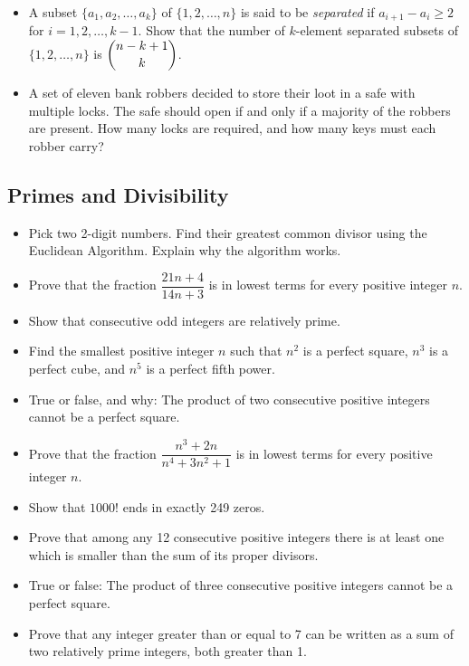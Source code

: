 \documentclass[12pt]{article}
\begin{document}
\begin{itemize}
  \item A subset $\{a_1, a_2, \ldots, a_k\}$ of $\{1, 2, \ldots, n\}$ is said to be \emph{separated} if $a_{i+1} - a_i \ge 2$ for $i = 1, 2, \ldots, k-1$. Show that the number of $k$-element separated subsets of $\{1, 2, \ldots, n\}$ is $\dbinom{n-k+1}{k}$.

  \item  A set of eleven bank robbers decided to store their loot in a safe with multiple locks. The safe should open if and only if a majority of the robbers are present. How many locks are required, and how many keys must each robber carry?
\end{itemize}

\subsection{Primes and Divisibility}
\begin{itemize}
  \item Pick two 2-digit numbers. Find their greatest common divisor using the Euclidean Algorithm. Explain why the algorithm works.

  \item Prove that the fraction $\dfrac{21n+4}{14n+3}$ is in lowest terms for every positive integer $n$.

  \item Show that consecutive odd integers are relatively prime.

  \item Find the smallest positive integer $n$ such that $n^2$ is a perfect square, $n^3$ is a perfect cube, and $n^5$ is a perfect fifth power.

  \item True or false, and why: The product of two consecutive positive integers cannot be a perfect square.

  \item Prove that the fraction $\dfrac{n^3+2n}{n^4+3n^2+1}$ is in lowest terms for every positive integer $n$.

  \item Show that $1000!$ ends in exactly 249 zeros.

  \item Prove that among any 12 consecutive positive integers there is at least one which is smaller than the sum of its proper divisors.

  \item True or false: The product of three consecutive positive integers cannot be a perfect square.

  \item  Prove that any integer greater than or equal to 7 can be written as a sum of two relatively prime integers, both greater than 1.
\end{itemize}
\end{document}
